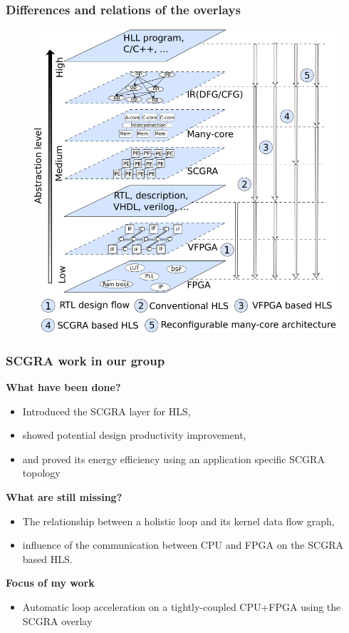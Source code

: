 \documentclass{beamer}
\begin{document}
\begin{frame}[t]
\frametitle{Differences and relations of the overlays}

\begin{figure}
\vspace{-1em}
\includegraphics[width=.7\linewidth]{virtual-overlay}
\end{figure}

\end{frame}

\begin{frame}[t]
\frametitle{SCGRA work in our group}

\vspace{-1em}
\textbf{What have been done?}
\begin{itemize}
\item Introduced the SCGRA layer for HLS,
\item showed potential design productivity improvement,
\item and proved its energy efficiency using an application specific SCGRA topology
\end{itemize}

\textbf{What are still missing?}
\begin{itemize}
\item The relationship between a holistic loop and its kernel data flow graph,
\item influence of the communication between CPU and FPGA on the SCGRA based HLS.
\end{itemize}

\textbf{Focus of my work}
\begin{itemize}
\item Automatic loop acceleration on a tightly-coupled CPU+FPGA using the SCGRA overlay
\end{itemize}
\end{frame}
\end{document}
